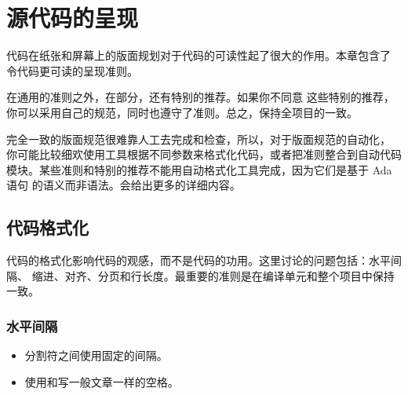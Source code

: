 %
%
%

\chapter{源代码的呈现}
\label{c:src}
代码在纸张和屏幕上的版面规划对于代码的可读性起了很大的作用。本章包含了
令代码更可读的呈现准则。

在通用的准则之外，在部分，还有特别的推荐。如果你不同意
这些特别的推荐，你可以采用自己的规范，同时也遵守了准则。总之，保持全项目的一致。

完全一致的版面规范很难靠人工去完成和检查，所以，对于版面规范的自动化，
你可能比较细欢使用工具根据不同参数来格式化代码，或者把准则整合到自动代码
模块。某些准则和特别的推荐不能用自动格式化工具完成，因为它们是基于 Ada 语句
的语义而非语法。会给出更多的详细内容。

\section{代码格式化}
代码的格式化影响代码的观感，而不是代码的功用。这里讨论的问题包括：水平间隔、
缩进、对齐、分页和行长度。最重要的准则是在编译单元和整个项目中保持一致。

\subsection{水平间隔}
\begin{itemize}
    \item 分割符之间使用固定的间隔。
    \item 使用和写一般文章一样的空格。
\end{itemize} 


